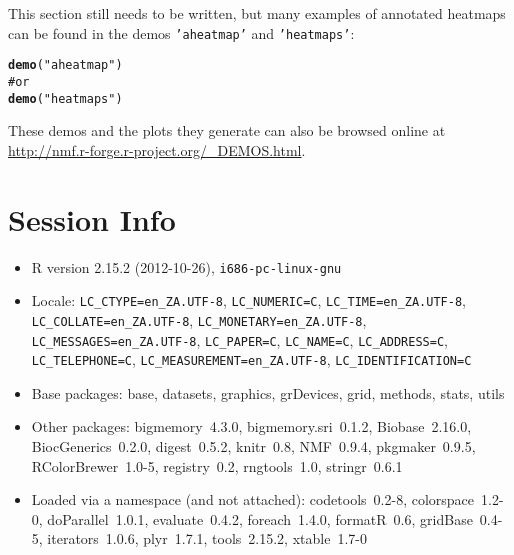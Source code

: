 \documentclass[a4paper]{article}\usepackage{graphicx, color}
\makeatletter
\newcommand{\hlfunctioncall}[1]{\textcolor[rgb]{0.501960784313725,0,0.329411764705882}{\textbf{#1}}}%
\newcommand{\hlstring}[1]{\textcolor[rgb]{0.6,0.6,1}{#1}}%
\newcommand{\hlcomment}[1]{\textcolor[rgb]{0.180392156862745,0.6,0.341176470588235}{#1}}%
\newenvironment{kframe}{%
 \def\at@end@of@kframe{}%
 \ifinner\ifhmode%
  \def\at@end@of@kframe{\end{minipage}}%
  \begin{minipage}{\columnwidth}%
 \fi\fi%
 \def\FrameCommand##1{\hskip\@totalleftmargin \hskip-\fboxsep
 \colorbox{shadecolor}{##1}\hskip-\fboxsep
     \hskip-\linewidth \hskip-\@totalleftmargin \hskip\columnwidth}%
 \MakeFramed {\advance\hsize-\width
   \@totalleftmargin\z@ \linewidth\hsize
   \@setminipage}}%
 {\par\unskip\endMakeFramed%
 \at@end@of@kframe}
\newenvironment{knitrout}{}{} %
\let\code=\texttt
\makeatother
\begin{document}
This section still needs to be written, but many examples of annotated heatmaps can be found in the demos \code{'aheatmap'} and \code{'heatmaps'}:
\begin{knitrout}
\color{fgcolor}\begin{kframe}
\begin{alltt}
\hlfunctioncall{demo}(\hlstring{"aheatmap"})
\hlcomment{# or}
\hlfunctioncall{demo}(\hlstring{"heatmaps"})
\end{alltt}
\end{kframe}
\end{knitrout}


These demos and the plots they generate can also be browsed online at \url{http://nmf.r-forge.r-project.org/_DEMOS.html}.

\section{Session Info}

\begin{itemize}\raggedright
  \item R version 2.15.2 (2012-10-26), \verb|i686-pc-linux-gnu|
  \item Locale: \verb|LC_CTYPE=en_ZA.UTF-8|, \verb|LC_NUMERIC=C|, \verb|LC_TIME=en_ZA.UTF-8|, \verb|LC_COLLATE=en_ZA.UTF-8|, \verb|LC_MONETARY=en_ZA.UTF-8|, \verb|LC_MESSAGES=en_ZA.UTF-8|, \verb|LC_PAPER=C|, \verb|LC_NAME=C|, \verb|LC_ADDRESS=C|, \verb|LC_TELEPHONE=C|, \verb|LC_MEASUREMENT=en_ZA.UTF-8|, \verb|LC_IDENTIFICATION=C|
  \item Base packages: base, datasets, graphics, grDevices, grid,
    methods, stats, utils
  \item Other packages: bigmemory~4.3.0, bigmemory.sri~0.1.2,
    Biobase~2.16.0, BiocGenerics~0.2.0, digest~0.5.2, knitr~0.8,
    NMF~0.9.4, pkgmaker~0.9.5, RColorBrewer~1.0-5, registry~0.2,
    rngtools~1.0, stringr~0.6.1
  \item Loaded via a namespace (and not attached):
    codetools~0.2-8, colorspace~1.2-0, doParallel~1.0.1,
    evaluate~0.4.2, foreach~1.4.0, formatR~0.6, gridBase~0.4-5,
    iterators~1.0.6, plyr~1.7.1, tools~2.15.2, xtable~1.7-0
\end{itemize}




\printbibliography[heading=bibintoc]
\end{document}
